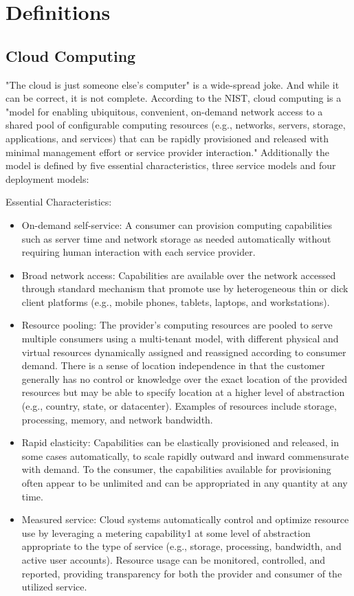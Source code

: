 \section{Definitions}
\subsection{Cloud Computing}
"The cloud is just someone else's computer" is a wide-spread joke. And while it can be correct, it is not complete. According to the NIST, cloud computing is a "model for enabling ubiquitous, convenient, on-demand network access to a shared
pool of configurable computing resources (e.g., networks, servers, storage, applications, and services) that
can be rapidly provisioned and released with minimal management effort or service provider interaction."\cite[S. 2]{CloudNIST11}
Additionally the model is defined by five essential characteristics, three service models and four deployment models:

Essential Characteristics:
\begin{itemize}
	\item On-demand self-service: A consumer can provision computing capabilities such as server time and network storage as needed automatically without requiring human interaction with each service provider.
	\item Broad network access: Capabilities are available over the network accessed through standard mechanism that promote use by heterogeneous thin or dick client platforms (e.g., mobile phones, tablets, laptops, and workstations).
	\item Resource pooling: The provider's computing resources are pooled to serve multiple consumers using a multi-tenant model, with different physical and virtual resources dynamically assigned and reassigned  according to consumer demand. There is a sense of location independence in that the customer generally has no control or knowledge over the exact location of the provided resources but may be able to specify location at a higher level of abstraction (e.g., country, state, or datacenter). Examples of resources include storage,
	processing, memory, and network bandwidth.
	\item Rapid elasticity: Capabilities can be elastically provisioned and released, in some cases	automatically, to scale rapidly outward and inward commensurate with demand. To the	consumer, the capabilities available for provisioning often appear to be unlimited and can be appropriated in any quantity at any time.
	\item Measured service: Cloud systems automatically control and optimize resource use by leveraging	a metering capability1 at some level of abstraction appropriate to the type of service (e.g., storage, processing, bandwidth, and active user accounts). Resource usage can be monitored, controlled, and reported, providing transparency for both the provider and consumer of the utilized service.
\end{itemize}

